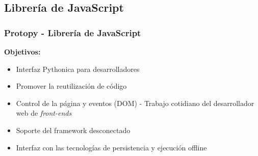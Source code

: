 \documentclass{beamer}
\begin{document}
\subsection{Librería de JavaScript}
\begin{frame}
    \frametitle{Protopy - Librería de JavaScript}
    
            {\bf Objetivos:}\par
                \begin{itemize}
                        \item{Interfaz Pythonica para desarrolladores}
                        \item{Promover la reutilización de código}
                        \item{Control de la página y eventos (DOM) - Trabajo
                        cotidiano del desarrollador web de {\it front-ends}}
                        \item{Soporte del framework desconectado}
                        \item{Interfaz con las tecnologías de persistencia y
                        ejecución offline} 
                \end{itemize}     
         
\end{frame}    
      
\end{document}
